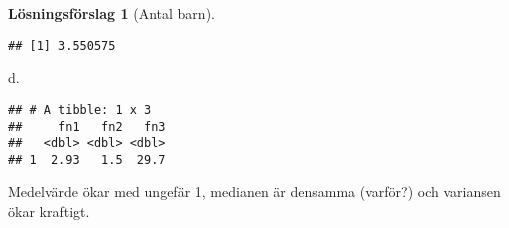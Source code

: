 \documentclass[
]{book}
\newenvironment{Shaded}{\begin{snugshade}}{\end{snugshade}}
\newcommand{\AttributeTok}[1]{\textcolor[rgb]{0.77,0.63,0.00}{#1}}
\newcommand{\CommentTok}[1]{\textcolor[rgb]{0.56,0.35,0.01}{\textit{#1}}}
\newcommand{\DecValTok}[1]{\textcolor[rgb]{0.00,0.00,0.81}{#1}}
\newcommand{\FunctionTok}[1]{\textcolor[rgb]{0.00,0.00,0.00}{#1}}
\newcommand{\NormalTok}[1]{#1}
\newcommand{\OtherTok}[1]{\textcolor[rgb]{0.56,0.35,0.01}{#1}}
\newcommand{\SpecialCharTok}[1]{\textcolor[rgb]{0.00,0.00,0.00}{#1}}
\newcommand{\StringTok}[1]{\textcolor[rgb]{0.31,0.60,0.02}{#1}}
\theoremstyle{definition}
\theoremstyle{definition}
\theoremstyle{definition}
\theoremstyle{definition}
\newtheorem{hypothesis}{Lösningsförslag}[chapter]
\theoremstyle{remark}
\begin{document}
\begin{hypothesis}[Antal barn]
\begin{verbatim}
## [1] 3.550575
\end{verbatim}

d.

\begin{Shaded}
\end{Shaded}

\begin{verbatim}
## # A tibble: 1 x 3
##     fn1   fn2   fn3
##   <dbl> <dbl> <dbl>
## 1  2.93   1.5  29.7
\end{verbatim}

Medelvärde ökar med ungefär 1, medianen är densamma (varför?) och variansen ökar kraftigt.
\end{hypothesis}
\end{document}
